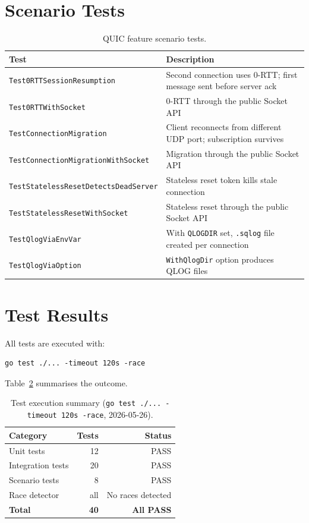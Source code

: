 \documentclass[12pt, a4paper, oneside]{report}
\begin{document}
\section{Scenario Tests}
\label{sec:scenario-tests}

\begin{table}[H]
  \centering
  \caption{QUIC feature scenario tests.}
  \label{tab:scenario-tests}
  \begin{tabularx}{\textwidth}{lX}
    \toprule
    \textbf{Test} & \textbf{Description} \\
    \midrule
    \texttt{Test0RTTSessionResumption} & Second connection uses 0-RTT; first message sent before server ack \\
    \texttt{Test0RTTWithSocket}       & 0-RTT through the public Socket API \\
    \texttt{TestConnectionMigration}  & Client reconnects from different UDP port; subscription survives \\
    \texttt{TestConnectionMigrationWithSocket} & Migration through the public Socket API \\
    \texttt{TestStatelessResetDetectsDeadServer} & Stateless reset token kills stale connection \\
    \texttt{TestStatelessResetWithSocket} & Stateless reset through the public Socket API \\
    \texttt{TestQlogViaEnvVar}        & With \texttt{QLOGDIR} set, \texttt{.sqlog} file created per connection \\
    \texttt{TestQlogViaOption}        & \texttt{WithQlogDir} option produces QLOG files \\
    \bottomrule
  \end{tabularx}
\end{table}

\section{Test Results}
\label{sec:test-results}

All tests are executed with:
\begin{verbatim}
go test ./... -timeout 120s -race
\end{verbatim}

Table~\ref{tab:test-results} summarises the outcome.

\begin{table}[H]
  \centering
  \caption{Test execution summary (\texttt{go test ./... -timeout 120s -race}, 2026-05-26).}
  \label{tab:test-results}
  \begin{tabular}{lrr}
    \toprule
    \textbf{Category} & \textbf{Tests} & \textbf{Status} \\
    \midrule
    Unit tests          & 12 & PASS \\
    Integration tests   & 20 & PASS \\
    Scenario tests      &  8 & PASS \\
    Race detector       & all & No races detected \\
    \midrule
    \textbf{Total}      & \textbf{40} & \textbf{All PASS} \\
    \bottomrule
  \end{tabular}
\end{table}
\end{document}
